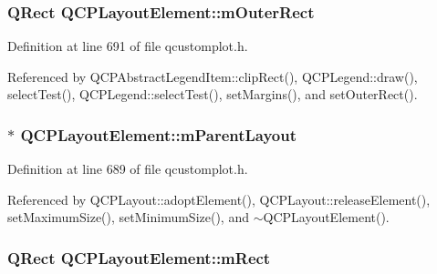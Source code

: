 \hypertarget{class_q_c_p_layout_element_a07bb4973379e75cb0fa5b032c1d24afd}{}
\subsubsection[{m\+Outer\+Rect}]{\setlength{\rightskip}{0pt plus 5cm}Q\+Rect Q\+C\+P\+Layout\+Element\+::m\+Outer\+Rect\hspace{0.3cm}{\ttfamily [protected]}}\label{class_q_c_p_layout_element_a07bb4973379e75cb0fa5b032c1d24afd}


Definition at line 691 of file qcustomplot.\+h.



Referenced by Q\+C\+P\+Abstract\+Legend\+Item\+::clip\+Rect(), Q\+C\+P\+Legend\+::draw(), select\+Test(), Q\+C\+P\+Legend\+::select\+Test(), set\+Margins(), and set\+Outer\+Rect().

\hypertarget{class_q_c_p_layout_element_ae7c75c25549608bd688bdb65d4c38066}{}
\subsubsection[{m\+Parent\+Layout}]{$\ast$ Q\+C\+P\+Layout\+Element\+::m\+Parent\+Layout\hspace{0.3cm}{\ttfamily [protected]}}\label{class_q_c_p_layout_element_ae7c75c25549608bd688bdb65d4c38066}


Definition at line 689 of file qcustomplot.\+h.



Referenced by Q\+C\+P\+Layout\+::adopt\+Element(), Q\+C\+P\+Layout\+::release\+Element(), set\+Maximum\+Size(), set\+Minimum\+Size(), and $\sim$\+Q\+C\+P\+Layout\+Element().

\hypertarget{class_q_c_p_layout_element_ad8896f05550389f7b9e92c9e6cdf6e01}{}
\subsubsection[{m\+Rect}]{\setlength{\rightskip}{0pt plus 5cm}Q\+Rect Q\+C\+P\+Layout\+Element\+::m\+Rect\hspace{0.3cm}{\ttfamily [protected]}}\label{class_q_c_p_layout_element_ad8896f05550389f7b9e92c9e6cdf6e01}


